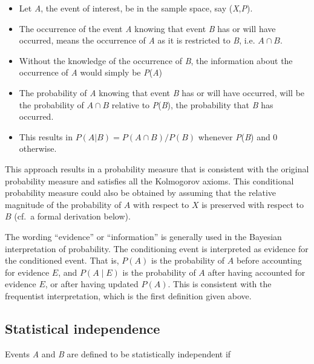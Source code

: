 \begin{itemize}
    \item Let \textit{A}, the event of interest, be in the sample space, say (\textit{X},\textit{P}).
    \item The occurrence of the event \textit{A} knowing that event \textit{B} has or will have occurred, means the occurrence of \textit{A} as it is restricted to \textit{B}, i.e. $A \cap B$.
    \item Without the knowledge of the occurrence of \textit{B}, the information about the occurrence of \textit{A} would simply be \textit{P}(\textit{A})
    \item The probability of \textit{A} knowing that event \textit{B} has or will have occurred, will be the probability of $A \cap B$ relative to \textit{P}(\textit{B}), the probability that \textit{B} has occurred.
    \item This results in $P(A|B) = P(A \cap B)/P(B)$ whenever \textit{P}(\textit{B})  and 0 otherwise.
\end{itemize}

This approach results in a probability measure that is consistent with the original
probability measure and satisfies all the Kolmogorov axioms. This conditional probability
measure could also be obtained by assuming that the relative magnitude of the probability
of $A$ with respect to $X$ is preserved with respect to $B$ (cf.\ a formal derivation below).

The wording ``evidence'' or ``information'' is generally used in the Bayesian interpretation
of probability. The conditioning event is interpreted as evidence for the conditioned
event. That is, $P(A)$ is the probability of $A$ before accounting for evidence $E$, and
$P(A \mid E)$ is the probability of $A$ after having accounted for evidence $E$, or after
having updated $P(A)$. This is consistent with the frequentist interpretation, which is
the first definition given above.



\subsection{Statistical independence}
\label{sss:stat-707a}




Events \textit{A} and \textit{B} are defined to be statistically independent if



